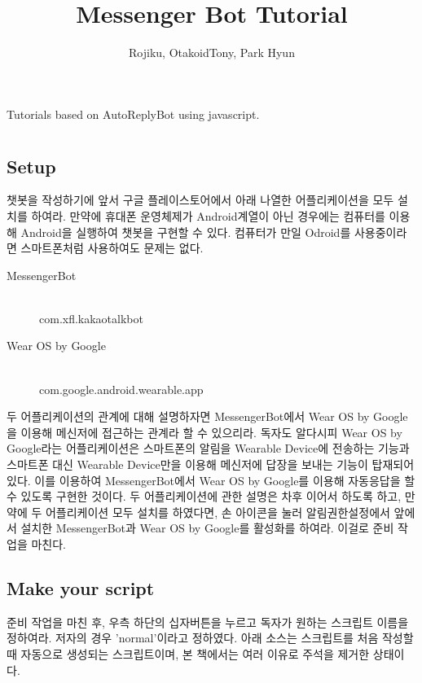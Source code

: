 \documentclass[10pt,a4paper,final]{book}
\author{Rojiku, OtakoidTony, Park Hyun}
\title{Messenger Bot Tutorial}
\begin{document}
\maketitle
Tutorials based on AutoReplyBot using javascript.
\chapter{}
\section{Setup}
챗봇을 작성하기에 앞서 구글 플레이스토어에서 아래 나열한 어플리케이션을 모두 설치를 하여라.
만약에 휴대폰 운영체제가 Android계열이 아닌 경우에는 컴퓨터를 이용해 Android을 실행하여 
챗봇을 구현할 수 있다. 컴퓨터가 만일 Odroid를 사용중이라면 스마트폰처럼 사용하여도 문제는
없다.

\begin{description}
\item[MessengerBot]\hfill\\
com.xfl.kakaotalkbot
\item[Wear OS by Google]\hfill\\
com.google.android.wearable.app
\end{description}
두 어플리케이션의 관계에 대해 설명하자면 MessengerBot에서 
Wear OS by Google을 이용해 메신저에 접근하는 관계라 할 수 있으리라.
독자도 알다시피 Wear OS by Google라는 어플리케이션은 스마트폰의 알림을
Wearable Device에 전송하는 기능과 스마트폰 대신 Wearable Device만을
이용해 메신저에 답장을 보내는 기능이 탑재되어 있다.
이를 이용하여 MessengerBot에서 Wear OS by Google를 이용해 자동응답을
할 수 있도록 구현한 것이다. 두 어플리케이션에 관한 설명은 차후 이어서 하도록 하고,
만약에 두 어플리케이션 모두 설치를 하였다면, 손 아이콘을 눌러 알림권한설정에서 앞에서 설치한
MessengerBot과 Wear OS by Google를 활성화를 하여라. 이걸로 준비 작업을 마친다.

\section{Make your script}
준비 작업을 마친 후, 우측 하단의 십자버튼을 누르고 독자가 원하는 스크립트 이름을 정하여라.
저자의 경우 'normal'이라고 정하였다.
아래 소스는 스크립트를 처음 작성할 때 자동으로 생성되는 스크립트이며,
본 책에서는 여러 이유로 주석을 제거한 상태이다.
\end{document}
